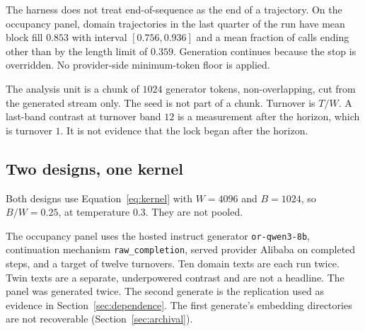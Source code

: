 \documentclass[10pt]{article}
\begin{document}
The harness does not treat end-of-sequence as the end of a trajectory.
On the occupancy panel, domain trajectories in the last quarter of the
run have mean block fill $0.853$ with interval $[0.756, 0.936]$ and a mean
fraction of calls ending other than by the length limit of $0.359$. %
Generation continues because the stop is overridden.
No provider-side minimum-token floor is applied.

The analysis unit is a chunk of $1024$ generator tokens, non-overlapping,
cut from the generated stream only. %
The seed is not part of a chunk.
Turnover is $T/W$.
A last-band contrast at turnover band $12$ is a measurement after the
horizon, which is turnover $1$.
It is not evidence that the lock began after the horizon.

\subsection{Two designs, one kernel}
\label{sec:designs}

Both designs use Equation~\eqref{eq:kernel} with $W{=}4096$ and
$B{=}1024$, so $B/W{=}0.25$, at temperature $0.3$. %
They are not pooled.

The occupancy panel uses the hosted instruct generator
\texttt{or-qwen3-8b}, continuation mechanism \texttt{raw\_completion},
served provider Alibaba on completed steps, and a target of twelve
turnovers. %
Ten domain texts are each run twice.
Twin texts are a separate, underpowered contrast and are not a headline.
The panel was generated twice.
The second generate is the replication used as evidence in
Section~\ref{sec:dependence}. %
The first generate's embedding directories are not recoverable
(Section~\ref{sec:archival}).
\end{document}
